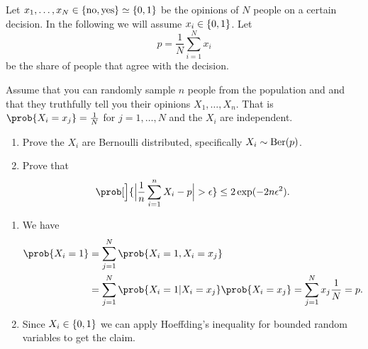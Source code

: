 \documentclass[11pt]{article}
\begin{document}

\begin{exercise}[subtitle={Single issue polling}]
    \label{ex: single issue polling} 
    Let \(x_1,\ldots, x_N \in \{\text{no}, \text{yes}\} \simeq \{0,1\}\) be the
    opinions of \(N\) people on a certain decision. In the following we will
    assume \(x_i \in \{0,1\}\). Let
    \[
        p = \frac1N\sum_{i=1}^N x_i
    \]
    be the share of people that agree with the decision.

    Assume that you can randomly sample \(n\) people from the population and
    and that they truthfully tell you their opinions \(X_1, \dots, X_n\).  That
    is \(\prob{X_i = x_j} = \frac1N\) for \(j=1, \ldots, N\) and the \(X_i\) are
    independent.
    \begin{enumerate}[label=(\alph*), noitemsep]
        \item\label{it: (single issue polling) distribution}
         Prove the \(X_i\) are Bernoulli distributed, specifically \(X_i \sim \mathrm{Ber}(p)\). 

        \item\label{it: (single issue polling) PAC bound}
        Prove that
        \[
            \prob[\Big]{\abs[\Big]{\frac1n \sum_{i=1}^n X_i - p} > \epsilon}
            \le 2\exp(-2n \epsilon^2).
        \]
    \end{enumerate}
\end{exercise}

\begin{solution}
\begin{enumerate}[wide=0pt]
    \item[\ref{it: (single issue polling) distribution}]
    We have
    \begin{align*}
        \prob{X_i = 1}
        &= \sum_{j=1}^N \prob{X_i = 1, X_i = x_j}
        \\
        &= \sum_{j=1}^N \prob{X_i = 1 | X_i = x_j} \prob{X_i = x_j}
        = \sum_{j=1}^N x_j \frac1N = p.
    \end{align*}

    \item[\ref{it: (single issue polling) PAC bound}]
    Since \(X_i \in \{0,1\}\) we can apply Hoeffding's inequality for
    bounded random variables to get the claim.

    \qedhere
\end{enumerate} 
\end{solution}
\end{document}
